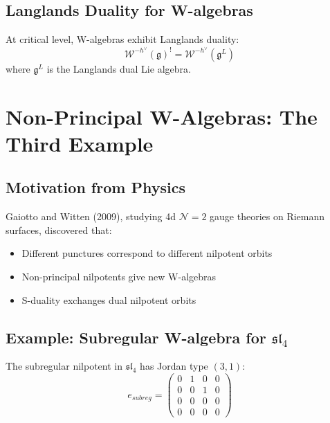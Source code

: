 \subsection{Langlands Duality for W-algebras}

\begin{theorem}
At critical level, W-algebras exhibit Langlands duality:
\[
\mathcal{W}^{-h^{\vee}}(\mathfrak{g})^! = \mathcal{W}^{-h^{\vee}}(\mathfrak{g}^L)
\]
where $\mathfrak{g}^L$ is the Langlands dual Lie algebra.
\end{theorem}


\section{Non-Principal W-Algebras: The Third Example}

\subsection{Motivation from Physics}

Gaiotto and Witten (2009), studying 4d $\mathcal{N}=2$ gauge theories on Riemann surfaces, discovered that:
\begin{itemize}
\item Different punctures correspond to different nilpotent orbits
\item Non-principal nilpotents give new W-algebras
\item S-duality exchanges dual nilpotent orbits
\end{itemize}

\subsection{Example: Subregular W-algebra for $\mathfrak{sl}_4$}

\begin{definition}
The subregular nilpotent in $\mathfrak{sl}_4$ has Jordan type $(3,1)$:
\[
e_{subreg} = \begin{pmatrix} 0 & 1 & 0 & 0 \\ 0 & 0 & 1 & 0 \\ 0 & 0 & 0 & 0 \\ 0 & 0 & 0 & 0 \end{pmatrix}
\]
\end{definition}

